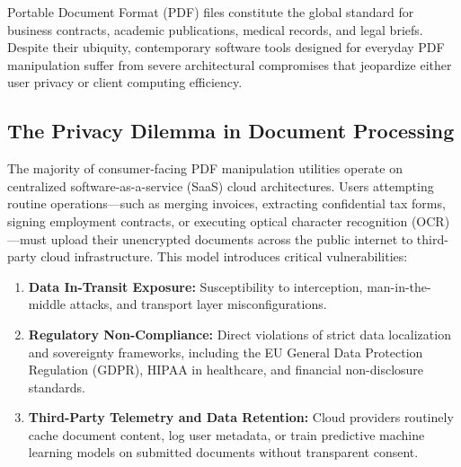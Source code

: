 \documentclass[11pt,a4paper]{article}
\begin{document}
Portable Document Format (PDF) files \cite{iso32000} constitute the global standard for business contracts, academic publications, medical records, and legal briefs. Despite their ubiquity, contemporary software tools designed for everyday PDF manipulation suffer from severe architectural compromises that jeopardize either user privacy or client computing efficiency.

\subsection{The Privacy Dilemma in Document Processing}
The majority of consumer-facing PDF manipulation utilities operate on centralized software-as-a-service (SaaS) cloud architectures. Users attempting routine operations---such as merging invoices, extracting confidential tax forms, signing employment contracts, or executing optical character recognition (OCR)---must upload their unencrypted documents across the public internet to third-party cloud infrastructure. This model introduces critical vulnerabilities:
\begin{enumerate}[label=(\alph*)]
    \item \textbf{Data In-Transit Exposure:} Susceptibility to interception, man-in-the-middle attacks, and transport layer misconfigurations.
    \item \textbf{Regulatory Non-Compliance:} Direct violations of strict data localization and sovereignty frameworks, including the EU General Data Protection Regulation (GDPR), HIPAA in healthcare, and financial non-disclosure standards.
    \item \textbf{Third-Party Telemetry and Data Retention:} Cloud providers routinely cache document content, log user metadata, or train predictive machine learning models on submitted documents without transparent consent.
\end{enumerate}
\end{document}
